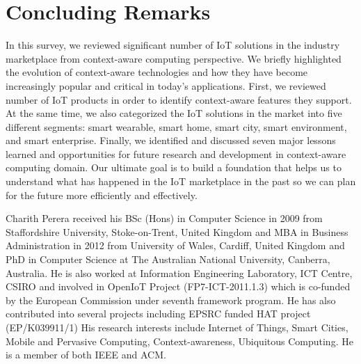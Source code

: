 \documentclass[journal]{IEEEtran}
\begin{document}
      
      
      
      
      
      



 
 \section{Concluding Remarks}
 \label{sec:Conclusions}
 
In this survey, we reviewed significant number of  IoT solutions in the industry marketplace from context-aware computing perspective. We briefly highlighted the evolution of context-aware technologies and how they have become increasingly popular and critical in today's applications. First, we reviewed number of IoT products in order to identify context-aware features they support. At the same time, we also categorized the IoT solutions in the market into five different segments: smart wearable, smart home, smart city, smart environment, and smart enterprise. Finally, we identified and discussed seven major lessons learned and opportunities for future research and development in context-aware computing domain. Our ultimate goal is to build a foundation that helps us to understand what has happened in the IoT marketplace in the past so we can plan for the future more efficiently and effectively.





 
 

 


 
 
 
 


\ifCLASSOPTIONcaptionsoff
  \newpage
\fi






















\begin{IEEEbiography}{Charith Perera}
received his BSc (Hons) in Computer Science in 2009 from Staffordshire University, Stoke-on-Trent, United Kingdom and MBA in Business Administration in 2012 from University of Wales, Cardiff, United Kingdom and PhD in Computer Science at The Australian National University, Canberra, Australia. He is also worked at Information Engineering Laboratory, ICT Centre, CSIRO and involved in OpenIoT Project (FP7-ICT-2011.1.3) which is co-funded by the European Commission under seventh framework program. He has also contributed into several projects including EPSRC funded HAT project (EP/K039911/1)  His research interests include Internet of Things, Smart Cities, Mobile and Pervasive Computing, Context-awareness, Ubiquitous Computing. He is a member of both IEEE and ACM.
\end{IEEEbiography}
\end{document}
